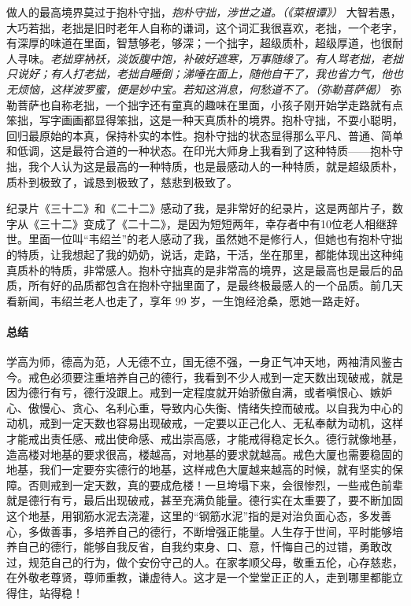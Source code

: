 做人的最高境界莫过于抱朴守拙，\textit{抱朴守拙，涉世之道。（《菜根谭》）} 大智若愚，大巧若拙，老拙是旧时老年人自称的谦词，这个词汇我很喜欢，老拙，一个老字，有深厚的味道在里面，智慧够老，够深；一个拙字，超级质朴，超级厚道，也很耐人寻味。\textit{老拙穿衲袄，淡饭腹中饱，补破好遮寒，万事随缘了。有人骂老拙，老拙只说好；有人打老拙，老拙自睡倒；涕唾在面上，随他自干了，我也省力气，他也无烦恼，这样波罗蜜，便是妙中宝。若知这消息，何愁道不了。（弥勒菩萨偈）} 弥勒菩萨也自称老拙，一个拙字还有童真的趣味在里面，小孩子刚开始学走路就有点笨拙，写字画画都显得笨拙，这是一种天真质朴的境界。抱朴守拙，不耍小聪明，回归最原始的本真，保持朴实的本性。抱朴守拙的状态显得那么平凡、普通、简单和低调，这是最符合道的一种状态。在印光大师身上我看到了这种特质——抱朴守拙，我个人认为这是最高的一种特质，也是最感动人的一种特质，就是超级质朴，质朴到极致了，诚恳到极致了，慈悲到极致了。

纪录片《三十二》和《二十二》感动了我，是非常好的纪录片，这是两部片子，数字从《三十二》变成了《二十二》，是因为短短两年，幸存者中有10位老人相继辞世。里面一位叫“韦绍兰”的老人感动了我，虽然她不是修行人，但她也有抱朴守拙的特质，让我想起了我的奶奶，说话，走路，干活，坐在那里，都能体现出这种纯真质朴的特质，非常感人。抱朴守拙真的是非常高的境界，这是最高也是最后的品质，所有好的品质都包含在抱朴守拙里面了，是最终极最感人的一个品质。前几天看新闻，韦绍兰老人也走了，享年 99 岁，一生饱经沧桑，愿她一路走好。

\paragraph{总结}

学高为师，德高为范，人无德不立，国无德不强，一身正气冲天地，两袖清风鉴古今。戒色必须要注重培养自己的德行，我看到不少人戒到一定天数出现破戒，就是因为德行有亏，德行没跟上。戒到一定程度就开始骄傲自满，或者嗔恨心、嫉妒心、傲慢心、贪心、名利心重，导致内心失衡、情绪失控而破戒。以自我为中心的动机，戒到一定天数也容易出现破戒，一定要以正己化人、无私奉献为动机，这样才能戒出责任感、戒出使命感、戒出崇高感，才能戒得稳定长久。德行就像地基，造高楼对地基的要求很高，楼越高，对地基的要求就越高。戒色大厦也需要稳固的地基，我们一定要夯实德行的地基，这样戒色大厦越来越高的时候，就有坚实的保障。否则戒到一定天数，真的要成危楼！一旦垮塌下来，会很惨烈，一些戒色前辈就是德行有亏，最后出现破戒，甚至充满负能量。德行实在太重要了，要不断加固这个地基，用钢筋水泥去浇灌，这里的“钢筋水泥”指的是对治负面心态，多发善心，多做善事，多培养自己的德行，不断增强正能量。人生存于世间，平时能够培养自己的德行，能够自我反省，自我约束身、口、意，忏悔自己的过错，勇敢改过，规范自己的行为，做个安份守己的人。在家孝顺父母，敬重五伦，心存慈悲，在外敬老尊贤，尊师重教，谦虚待人。这才是一个堂堂正正的人，走到哪里都能立得住，站得稳！

